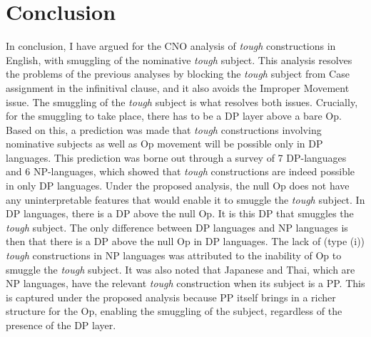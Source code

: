 \documentclass[output=paper,colorlinks,citecolor=brown,
]{langscibook}
\begin{document}
\section{Conclusion} \label{s4ha}
In conclusion, I have argued for the CNO analysis \citep{Hicks2009} of \textit{tough} constructions in English, with smuggling of the nominative \textit{tough} subject. This analysis resolves the problems of the previous analyses by blocking the \textit{tough} subject from Case assignment in the infinitival clause, and it also avoids the Improper Movement issue. The smuggling of the \textit{tough} subject is what resolves both issues. Crucially, for the smuggling to take place, there has to be a DP layer above a bare Op. Based on this, a prediction was made that \textit{tough} constructions involving nominative subjects as well as Op movement will be possible only in DP languages. This prediction was borne out through a survey of 7 DP-languages and 6 NP-languages, which showed that \textit{tough} constructions are indeed possible in only DP languages. Under the proposed analysis, the null Op does not have any uninterpretable features that would enable it to smuggle the \textit{tough} subject. In DP languages, there is a DP above the null Op. It is this DP that smuggles the \textit{tough} subject. The only difference between DP languages and NP languages is then that there is a DP above the null Op in DP languages. The lack of (type (i)) \textit{tough} constructions in NP languages was attributed to the inability of Op to smuggle the \textit{tough} subject. It was also noted that Japanese and Thai, which are NP languages, have the relevant \textit{tough} construction when its subject is a PP. This is captured under the proposed analysis because PP itself brings in a richer structure for the Op, enabling the smuggling of the subject, regardless of the presence of the DP layer. 
\end{document}
